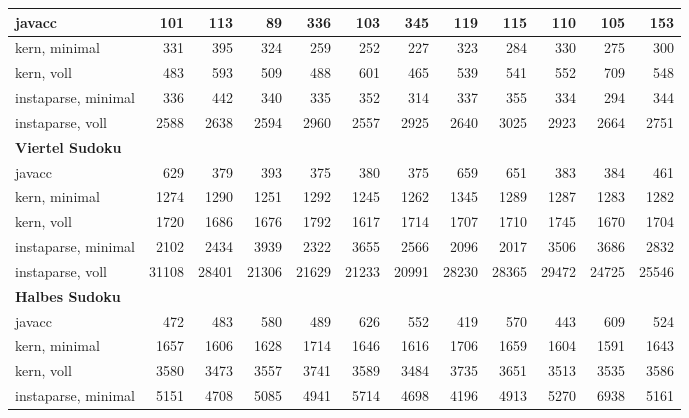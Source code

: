 \documentclass[ngerman,a4paper,abstracton,open=right,twoside=false,toc=listofnumbered,bibtotocnumbered]{scrreprt}
\begin{document}
\begin{table}[!h]
{{\begin{tabular}{|l|r|r|r|r|r|r|r|r|r|r|r|}
				javacc  & 101 & 113 & 89 & 336 & 103 & 345 & 119 & 115 & 110 & 105 & 153 \\ \hline
				kern, minimal   & 331 & 395 & 324 & 259 & 252 & 227 & 323 & 284 & 330 & 275 & 300 \\ \hline
				kern, voll   & 483 & 593 & 509 & 488 & 601 & 465 & 539 & 541 & 552 & 709 & 548 \\ \hline
				instaparse, minimal   & 336 & 442 & 340 & 335 & 352 & 314 & 337 & 355 & 334 & 294 & 344 \\ \hline
				instaparse, voll   & 2588 & 2638 & 2594 & 2960 & 2557 & 2925 & 2640 & 3025 & 2923 & 2664 & 2751 \\ \hline
				\textbf{Viertel Sudoku} & \multicolumn{1}{l|}{} & \multicolumn{1}{l|}{} & \multicolumn{1}{l|}{} & \multicolumn{1}{l|}{} & \multicolumn{1}{l|}{} & \multicolumn{1}{l|}{} & \multicolumn{1}{l|}{} & \multicolumn{1}{l|}{} & \multicolumn{1}{l|}{} & \multicolumn{1}{l|}{} & \multicolumn{1}{l|}{} \\ \hline
				javacc  & 629 & 379 & 393 & 375 & 380 & 375 & 659 & 651 & 383 & 384 & 461 \\ \hline
				kern, minimal   & 1274 & 1290 & 1251 & 1292 & 1245 & 1262 & 1345 & 1289 & 1287 & 1283 & 1282 \\ \hline
				kern, voll   & 1720 & 1686 & 1676 & 1792 & 1617 & 1714 & 1707 & 1710 & 1745 & 1670 & 1704 \\ \hline
				instaparse, minimal   & 2102 & 2434 & 3939 & 2322 & 3655 & 2566 & 2096 & 2017 & 3506 & 3686 & 2832 \\ \hline
				instaparse, voll   & 31108 & 28401 & 21306 & 21629 & 21233 & 20991 & 28230 & 28365 & 29472 & 24725 & 25546 \\ \hline
				\textbf{Halbes Sudoku} & \multicolumn{1}{l|}{} & \multicolumn{1}{l|}{} & \multicolumn{1}{l|}{} & \multicolumn{1}{l|}{} & \multicolumn{1}{l|}{} & \multicolumn{1}{l|}{} & \multicolumn{1}{l|}{} & \multicolumn{1}{l|}{} & \multicolumn{1}{l|}{} & \multicolumn{1}{l|}{} & \multicolumn{1}{l|}{} \\ \hline
				javacc  & 472 & 483 & 580 & 489 & 626 & 552 & 419 & 570 & 443 & 609 & 524 \\ \hline
				kern, minimal   & 1657 & 1606 & 1628 & 1714 & 1646 & 1616 & 1706 & 1659 & 1604 & 1591 & 1643 \\ \hline
				kern, voll   & 3580 & 3473 & 3557 & 3741 & 3589 & 3484 & 3735 & 3651 & 3513 & 3535 & 3586 \\ \hline
				instaparse, minimal   & 5151 & 4708 & 5085 & 4941 & 5714 & 4698 & 4196 & 4913 & 5270 & 6938 & 5161 \\ \hline

\end{tabular}}}
\end{table}
\end{document}
